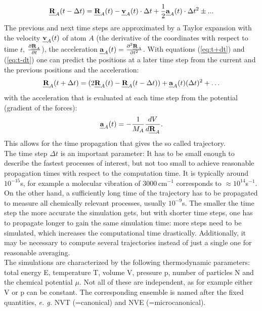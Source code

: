 \documentclass[11pt,DIV=13,BCOR=5mm,a4paper,headinclude]{scrbook}
\def\mathbi#1{\textbf{\em #1}}
\renewcommand{\vec}[1]{\mathbi{#1}}
\begin{document}
 \begin{equation}\label{eq:t-dt}
 \vec{R}_A(t-\Delta t) = \vec{R}_A(t) - \vec{v}_A(t)\cdot \Delta t + \frac{1}{2}\vec{a}_A(t)\cdot \Delta t^2 \pm ...
\end{equation}
The previous and next time steps are approximated by a Taylor expansion with the velocity $\vec{v}_A(t)$ of atom $A$ (the derivative of the coordinates with respect to time $t$, $\frac{\partial \vec{R}_A}{\partial t}$), the acceleration $\vec{a}_A(t)=\frac{\partial^2 \vec{R}_A}{\partial t^2}$.
With equations (\ref{eq:t+dt}) and (\ref{eq:t-dt}) one can predict the positions at a later time step from the current and the previous positions and the acceleration:
\begin{equation}
 \vec{R}_A(t+\Delta t)=(2\vec{R}_A(t) - \vec{R}_A(t-\Delta t)) + \vec{a}_A(t)(\Delta t)^2 + \ldots
\end{equation}
with the acceleration that is evaluated at each time step from the potential (gradient of the forces):
\begin{equation}
 \vec{a}_A(t)=-\frac{1}{M_A}\frac{dV}{d\vec{R}_A}.
\end{equation}
This allows for the time propagation that gives the so called trajectory.
\\
The time step $\Delta t$ is an important parameter: It has to be small enough to describe the fastest processes of interest, but not too small to achieve reasonable propagation times with respect to the computation time.
It is typically around $10^{-15}$s, for example a molecular vibration of $3000\,$cm$^{-1}$ corresponds to $\approx 10^{14}$s$^{-1}$.
On the other hand, a sufficiently long time of the trajectory has to be propagated to measure all chemically relevant processes, usually $10^{-9}$s.
The smaller the time step the more accurate the simulation gets, but with shorter time steps, one has to propagate longer to gain the same simulation time: more steps need to be simulated, which increases the computational time drastically.
Additionally, it may be necessary to compute several trajectories instead of just a single one for reasonable averaging.
\\
The simulations are characterized by the following thermodynamic parameters: total energy E, temperature T, volume V, pressure p, number of particles N and the chemical potential $\mu$.
Not all of these are independent, as for example either V or p can be constant.
The corresponding ensemble is named after the fixed quantities, \textit{e.
g.} NVT (=canonical) and NVE (=microcanonical).
\\
\end{document}
